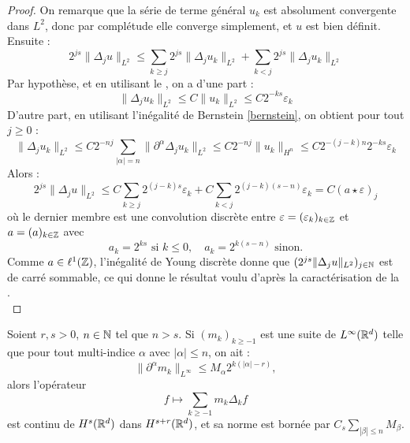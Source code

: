 \documentclass[11pt,a4paper]{article}
\begin{document}
\begin{proof}
On remarque que la série de terme général $u_k$ est absolument convergente dans $L^2$, donc par complétude elle converge simplement, et $u$ est bien définit. Ensuite : 
\begin{equation*}
2^{js}\|\Delta_ju\|_{L^2} \leq \sum_{k\geq j} 2^{js}\|\Delta_ju_k\|_{L^2} + \sum_{k < j} 2^{js}\|\Delta_ju_k\|_{L^2}
\end{equation*}
Par hypothèse, et en utilisant le , on a d'une part :
\begin{equation*}
\|\Delta_ju_k\|_{L^2} \leq C \|u_k\|_{L^2} \leq C2^{-ks}\varepsilon_k
\end{equation*}
D'autre part, en utilisant l'inégalité de Bernstein \eqref{bernstein}, on obtient pour tout $j\geq 0$ :
\begin{equation*}
\|\Delta_ju_k\|_{L^2} \leq C 2^{-nj} \sum_{|\alpha|=n} \|\partial^\alpha\Delta_ju_k\|_{L^2} \leq C 2^{-nj} \|u_k\|_{H^n} \leq C 2^{-(j-k)n}2^{-ks}\varepsilon_k
\end{equation*}
Alors :
\begin{equation*}
2^{js}\|\Delta_ju\|_{L^2} \leq C \sum_{k\geq j} 2^{(j-k)s}\varepsilon_k + C \sum_{k < j} 2^{(j-k)(s-n)}\varepsilon_k = C (a \star \varepsilon)_j
\end{equation*}
où le dernier membre est une convolution discrète entre $\varepsilon = (\varepsilon_k)_{k\in \mathbb Z}$ et  $a = (a)_{k\in \mathbb Z}$ avec
\[a_k=2^{ks} \text{ si } k \leq 0, \quad a_k=2^{k(s-n)} \text{ sinon.}\]
Comme $a\in \ell^1(\mathbb Z)$, l'inégalité de Young discrète donne que $(2^{js}\|\Delta_ju\|_{L^2})_{j\in \mathbb N}$ est de carré sommable, ce qui donne le résultat voulu d'après la caractérisation de la . \\
\end{proof}


\begin{cor}\label{true_meyer}
Soient $r,s>0$, $n\in\mathbb N$ tel que $n>s$. Si $(m_k)_{k \geq -1}$ est une suite de $L^\infty(\mathbb R^d)$ telle que pour tout multi-indice $\alpha$ avec $|\alpha|\leq n$, on ait :
\begin{equation*}
\|\partial^\alpha m_k\|_{L^\infty} \leq M_\alpha 2^{k(|\alpha|-r)},
\end{equation*}
alors l'opérateur 
\begin{equation*}
f \mapsto \sum_{k\geq -1} m_k\Delta_kf
\end{equation*}
est continu de $H^s(\mathbb R^d)$ dans $H^{s+r}(\mathbb R^d)$, et sa norme est bornée par $C_s\displaystyle \sum_{|\beta|\leq n} M_\beta$.
\end{cor}
\end{document}
